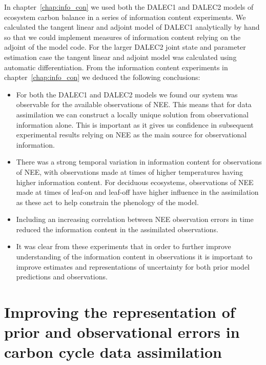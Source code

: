In chapter~\ref{chap:info_con} we used both the DALEC1 and DALEC2 models of ecosystem carbon balance in a series of information content experiments. We calculated the tangent linear and adjoint model of DALEC1 analytically by hand so that we could implement measures of information content relying on the adjoint of the model code. For the larger DALEC2 joint state and parameter estimation case the tangent linear and adjoint model was calculated using automatic differentiation. From the information content experiments in chapter~\ref{chap:info_con} we deduced the following conclusions:
\begin{itemize}
\item For both the DALEC1 and DALEC2 models we found our system was observable for the available observations of NEE. This means that for data assimilation we can construct a locally unique solution from observational information alone. This is important as it gives us confidence in subsequent experimental results relying on NEE as the main source for observational information.
\item There was a strong temporal variation in information content for observations of NEE, with observations made at times of higher temperatures having higher information content. For deciduous ecosystems, observations of NEE made at times of leaf-on and leaf-off have higher influence in the assimilation as these act to help constrain the phenology of the model. 
\item Including an increasing correlation between NEE observation errors in time reduced the information content in the assimilated observations. 
\item It was clear from these experiments that in order to further improve understanding of the information content in observations it is important to improve estimates and representations of uncertainty for both prior model predictions and observations.
\end{itemize}

\section{Improving the representation of prior and observational errors in carbon cycle data assimilation}

